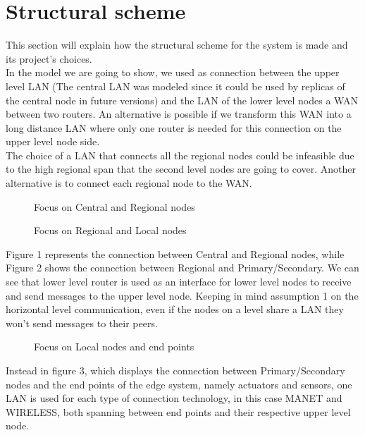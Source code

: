 \documentclass[11pt]{article}
\begin{document}
\section{Structural scheme}
This section will explain how the structural scheme for the system is made and its project's choices.\\
In the model we are going to show, we used as connection between the upper level LAN (The central LAN was modeled since it could be used by replicas of the central node in future versions) and the LAN of the lower level nodes a WAN between two routers.  An alternative is possible if we transform this WAN into a long distance LAN where only one router is needed for this connection on the upper level node side.\\
The choice of a LAN that connects all the regional nodes could be infeasible due to the high regional span that the second level nodes are going to cover. Another alternative is to connect each regional node to the WAN.
\begin{figure}[H]
	\hspace*{-3.75cm}
	\centering
  \frame{}
  \caption{Focus on Central and Regional nodes}
\end{figure}
\begin{figure}[H]
	\hspace*{-3.75cm}
	\frame{}
	\caption{Focus on Regional and Local nodes}
\end{figure}
Figure 1 represents the connection between Central and Regional nodes, while Figure 2 shows the connection between Regional and Primary/Secondary. We can  see that lower level router is used as an interface for lower level nodes to receive and send messages to the upper level node. Keeping in mind assumption 1 on the horizontal level communication, even if the nodes on a level share a LAN they won't send messages to their peers.\\
\begin{figure}[H]
	\hspace*{-3.75cm}
  \frame{}
  \caption{Focus on Local nodes and end points}
\end{figure}
Instead in figure 3, which displays the connection between Primary/Secondary nodes and the end points of the edge system, namely actuators and sensors, one LAN is used for each type of connection technology, in this case MANET and WIRELESS, both spanning between end points and their respective upper level node.\\
\end{document}
